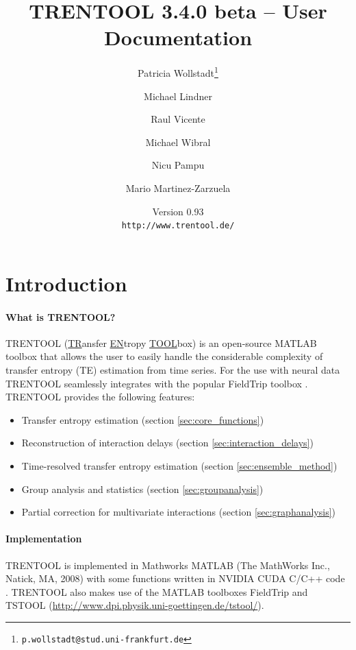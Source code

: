 \documentclass[a4paper,10pt]{article}
\begin{document}
\title{TRENTOOL 3.4.0 beta -- User Documentation}
\author{Patricia Wollstadt\thanks{\texttt{p.wollstadt@stud.uni-frankfurt.de}} \and Michael Lindner \and Raul Vicente \and Michael Wibral \and Nicu Pampu \and Mario Martinez-Zarzuela}
\date{Version 0.93\\ 
\texttt{http://www.trentool.de/}}

\maketitle
\tableofcontents
\newpage
\listoffigures
\listoftables
\listoflistings

\newpage
\section{Introduction}

\paragraph*{What is TRENTOOL?} TRENTOOL (\underline{TR}ansfer \underline{EN}tropy \underline{TOOL}box) is an open-source MATLAB toolbox that allows the user to easily handle the considerable complexity of transfer entropy (TE) estimation from time series. For the use with neural data TRENTOOL seamlessly integrates with the popular FieldTrip toolbox \cite{oostenveld2011}. TRENTOOL provides the following features:

\begin{itemize}
 \item Transfer entropy estimation (section \ref{sec:core_functions}) %
 \item Reconstruction of interaction delays (section \ref{sec:interaction_delays})
 \item Time-resolved transfer entropy estimation (section \ref{sec:ensemble_method})
 \item Group analysis and statistics (section \ref{sec:groupanalysis})
 \item Partial correction for multivariate interactions (section \ref{sec:graphanalysis})
\end{itemize}


\paragraph*{Implementation} TRENTOOL is implemented in Mathworks\textregistered{} MATLAB\textregistered{} (The MathWorks Inc., Natick, MA, 2008)  with some functions written in NVIDIA\textregistered{} CUDA\texttrademark{} C/C++ code \cite{nvidia2008}. TRENTOOL also makes use of the MATLAB toolboxes FieldTrip \cite{oostenveld2011} and TSTOOL (\url{http://www.dpi.physik.uni-goettingen.de/tstool/}).
\end{document}
